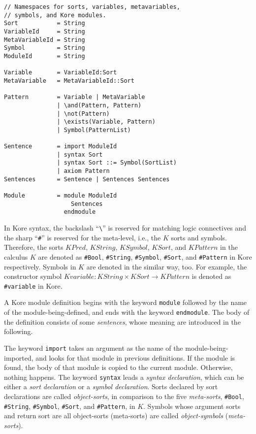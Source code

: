 \documentclass[UTF8,11pt]{article}
\theoremstyle{plain}
\theoremstyle{definition}
\theoremstyle{remark}
\newcommand{\KPred}{\mathit{KPred}}
\newcommand{\KString}{\mathit{KString}}
\newcommand{\KSort}{\mathit{KSort}}
\newcommand{\KSymbol}{\mathit{KSymbol}}
\newcommand{\KPattern}{\mathit{KPattern}}
\newcommand{\Kvariable}{\mathit{Kvariable}}
\begin{document}
\begin{Verbatim}[fontsize=\small]
// Namespaces for sorts, variables, metavariables,
// symbols, and Kore modules.
Sort           = String
VariableId     = String
MetaVariableId = String
Symbol         = String
ModuleId       = String

Variable       = VariableId:Sort
MetaVariable   = MetaVariableId::Sort

Pattern        = Variable | MetaVariable
               | \and(Pattern, Pattern)
               | \not(Pattern)
               | \exists(Variable, Pattern)
               | Symbol(PatternList)

Sentence       = import ModuleId
               | syntax Sort
               | syntax Sort ::= Symbol(SortList)
               | axiom Pattern
Sentences      = Sentence | Sentences Sentences

Module         = module ModuleId
                   Sentences
                 endmodule
\end{Verbatim}

In Kore syntax, the backslash ``\verb|\|'' is reserved for matching logic connectives and the sharp ``\verb|#|'' is reserved for the meta-level, i.e., the $K$ sorts and symbols. 
Therefore, the sorts $\KPred$, $\KString$, $\KSymbol$, $\KSort$, and 
$\KPattern$ in the calculus $K$ are denoted as \verb|#Bool|, \verb|#String|, 
\verb|#Symbol|, \verb|#Sort|, and \verb|#Pattern| in Kore respectively.
Symbols in $K$ are denoted in the similar way, too. 
For example, the constructor symbol $\Kvariable \colon \KString \times \KSort \to \KPattern$ is denoted as \verb|#variable| in Kore. 

A Kore module definition begins with the keyword \verb|module| followed by the name of the module-being-defined, and ends with the keyword \verb|endmodule|. The body of the definition consists of some \emph{sentences}, whose meaning are introduced in the following.

The keyword \verb|import| takes an argument as the name of the module-being-imported, and looks for that module in previous definitions. 
If the module is found, the body of that module is copied to the current module.
Otherwise, nothing happens. 
The keyword \verb|syntax| leads a \emph{syntax declaration}, which can be either a \emph{sort declaration} or a \emph{symbol declaration}.
Sorts declared by sort declarations are called \emph{object-sorts}, in comparison to the five \emph{meta-sorts}, \verb|#Bool|, \verb|#String|, \verb|#Symbol|, \verb|#Sort|, and \verb|#Pattern|, in $K$. 
Symbols whose argument sorts and return sort are all object-sorts (meta-sorts) are called \emph{object-symbols} (\emph{meta-sorts}).
\end{document}
